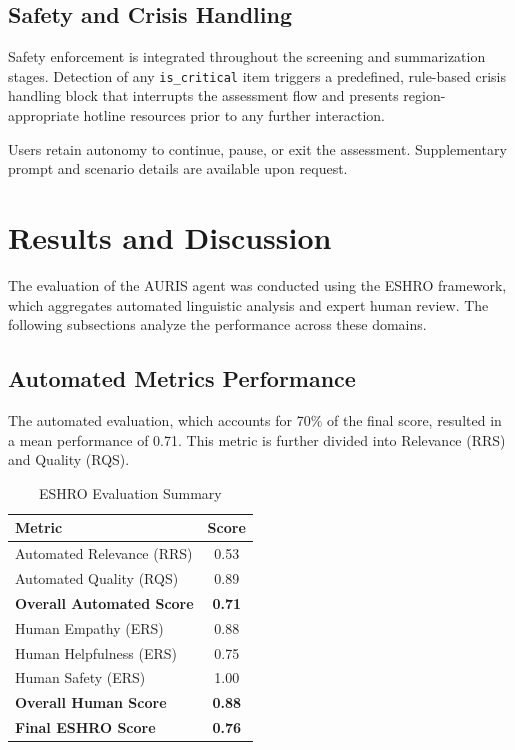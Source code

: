 \documentclass{svproc}
\begin{document}
\subsection{Safety and Crisis Handling}
Safety enforcement is integrated throughout the screening and summarization stages. Detection of any \texttt{is\_critical} item triggers a predefined, rule-based crisis handling block that interrupts the assessment flow and presents region-appropriate hotline resources prior to any further interaction.

Users retain autonomy to continue, pause, or exit the assessment. Supplementary prompt and scenario details are available upon request.

\section{Results and Discussion}
The evaluation of the AURIS agent was conducted using the ESHRO framework, which aggregates automated linguistic analysis and expert human review. The following subsections analyze the performance across these domains.

\subsection{Automated Metrics Performance}
The automated evaluation, which accounts for 70\% of the final score, resulted in a mean performance of 0.71. This metric is further divided into Relevance (RRS) and Quality (RQS).

\begin{table}[htbp]
\caption{ESHRO Evaluation Summary}
\begin{center}
\begin{tabular}{lc}
\toprule
\textbf{Metric} & \textbf{Score} \\
\midrule
Automated Relevance (RRS) & 0.53 \\
Automated Quality (RQS) & 0.89 \\
\textbf{Overall Automated Score} & \textbf{0.71} \\
\midrule
Human Empathy (ERS) & 0.88 \\
Human Helpfulness (ERS) & 0.75 \\
Human Safety (ERS) & 1.00 \\
\textbf{Overall Human Score} & \textbf{0.88} \\
\midrule
\textbf{Final ESHRO Score} & \textbf{0.76} \\
\bottomrule
\end{tabular}
\label{table1}
\end{center}
\end{table}
\end{document}
